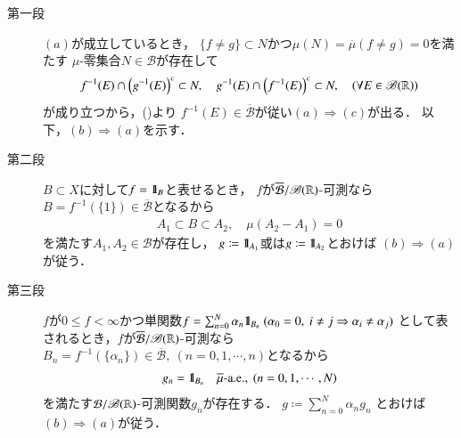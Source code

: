 		\begin{prf}\mbox{}
			\begin{description}
				\item[第一段]
					$(a)$が成立しているとき，
					$\{f \neq g\} \subset N$かつ$\mu(N) = \overline{\mu}(f \neq g) = 0$を満たす
					$\mu$-零集合$N \in \mathcal{B}$が存在して
					\begin{align}
						f^{-1}(E) \cap \left( g^{-1}(E) \right)^c \subset N,
						\quad g^{-1}(E) \cap \left( f^{-1}(E) \right)^c \subset N,
						\quad (\forall E \in \mathscr{B}(\mathbb{R}))
					\end{align}
					が成り立つから，()より
					$f^{-1}(E) \in \overline{\mathcal{B}}$が従い$(a) \Rightarrow (c)$が出る．
					以下，$(b) \Rightarrow (a)$を示す．
					
				\item[第二段]
					$B \subset X$に対して$f = \mbox{1}\hspace{-0.25em}\mbox{l}_B$と表せるとき，
					$f$が$\overline{\mathcal{B}}/\mathscr{B}(\mathbb{R})$-可測なら
					$B = f^{-1}(\{1\}) \in \overline{\mathcal{B}}$となるから
					\begin{align}
						A_1 \subset B \subset A_2,\quad \mu(A_2 - A_1)=0
					\end{align}
					を満たす$A_1,A_2 \in \mathcal{B}$が存在し，
					$g \coloneqq \mbox{1}\hspace{-0.25em}\mbox{l}_{A_1}$或は$g \coloneqq \mbox{1}\hspace{-0.25em}\mbox{l}_{A_2}$とおけば
					$(b) \Rightarrow (a)$が従う．
				
				\item[第三段]
					$f$が$0 \leq f < \infty$かつ単関数$f = \sum_{n=0}^N \alpha_n \defunc_{B_n}\ 
					(\alpha_0 = 0,\ i \neq j \Rightarrow \alpha_i \neq \alpha_j)$
					として表されるとき，$f$が$\overline{\mathcal{B}}/\mathscr{B}(\mathbb{R})$-可測なら
					$B_n = f^{-1}(\{\alpha_n\}) \in \overline{\mathcal{B}},\ (n=0,1,\cdots,n)$となるから
					\begin{align}
						g_n = \mbox{1}\hspace{-0.25em}\mbox{l}_{B_n} \quad \mbox{$\overline{\mu}$-a.e.},
						\ (n=0,1,\cdots,N)
					\end{align}
					を満たす$\mathcal{B}/\mathscr{B}(\mathbb{R})$-可測関数$g_n$が存在する．
					$g \coloneqq \sum_{n=0}^N \alpha_n g_n$
					とおけば$(b) \Rightarrow (a)$が従う．
					

\end{description}
\end{prf}
